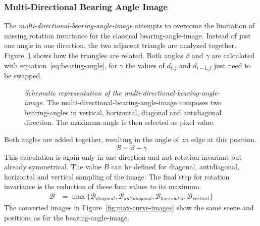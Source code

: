 \subsubsection{Multi-Directional Bearing Angle Image}

The \emph{\gls{multi-directional-bearing-angle-image}} attempts to overcome the limitation of missing rotation invariance for the classical \gls{bearing-angle-image}.
Instead of just one angle in one direction, the two adjacent triangle are analyzed together.
Figure~\ref{fig:max-curve} shows how the triangles are related.
Both angles $\beta$ and $\gamma$ are calculated with equation~\ref{eq:bearing-angle}, for $\gamma$ the values of $d_{i,j}$ and $d_{i-1,j}$ just need to be swapped.
\begin{figure}
    \scalebox{0.9}{%
    
    }
    \caption[Schematic representation of the \gls{multi-directional-bearing-angle-image}]{\emph{Schematic representation of the \gls{multi-directional-bearing-angle-image}.} The \gls{multi-directional-bearing-angle-image} composes two \Glspl{bearing-angle} in vertical, horizontal, diagonal and antidiagonal direction. The maximum angle is then selected as pixel value.}\label{fig:max-curve}
\end{figure}
Both angles are added together, resulting in the angle of an edge at this position.
\begin{equation}
    \mathcal{B} = \beta + \gamma
\end{equation}
This calculation is again only in one direction and not rotation invariant but already symmetrical.
The value $B$ can be defined for diagonal, antidiagonal, horizontal and vertical sampling of the image.
The final step for rotation invariance is the reduction of these four values to its maximum.
\begin{align}
    \mathcal{B} &= \max{\{\mathcal{B}_{diagonal}, \mathcal{B}_{antidiagonal}, \mathcal{B}_{horizontal}, \mathcal{B}_{vertical}\}}
\end{align}
The converted images in Figure~\ref{fig:max-curve-images} show the same scene and positions as for the \gls{bearing-angle-image}.
